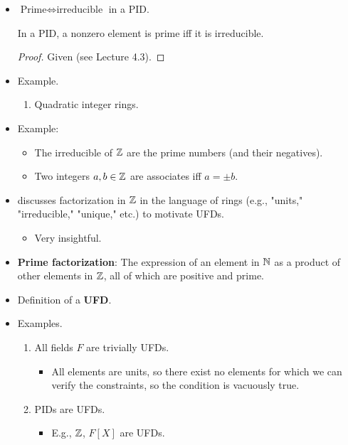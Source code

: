\documentclass[../notes.tex]{subfiles}
\begin{document}
\begin{itemize}
\begin{itemize}
    \end{itemize}
    \item $\text{Prime}\Longleftrightarrow\text{irreducible}$ in a PID.
    \begin{proposition}\label{prp:8.11}
        In a PID, a nonzero element is prime iff it is irreducible.
        \begin{proof}
            Given (see Lecture 4.3).
        \end{proof}
    \end{proposition}
    \item Example.
    \begin{enumerate}
        \item Quadratic integer rings.
    \end{enumerate}
    \item Example:
    \begin{itemize}
        \item The irreducible of $\mathbb{Z}$ are the prime numbers (and their negatives).
        \item Two integers $a,b\in\mathbb{Z}$ are associates iff $a=\pm b$.
    \end{itemize}
    \item \textcite{bib:DummitFoote} discusses factorization in $\mathbb{Z}$ in the language of rings (e.g., "units," "irreducible," "unique," etc.) to motivate UFDs.
    \begin{itemize}
        \item Very insightful.
    \end{itemize}
    \item \textbf{Prime factorization}: The expression of an element in $\mathbb{N}$ as a product of other elements in $\mathbb{Z}$, all of which are positive and prime.
    \item Definition of a \textbf{UFD}.
    \item Examples.
    \begin{enumerate}
        \item All fields $F$ are trivially UFDs.
        \begin{itemize}
            \item All elements are units, so there exist no elements for which we can verify the constraints, so the condition is vacuously true.
        \end{itemize}
        \item PIDs are UFDs.
        \begin{itemize}
            \item E.g., $\mathbb{Z}$, $F[X]$ are UFDs.

\end{itemize}
\end{enumerate}
\end{itemize}
\end{document}

